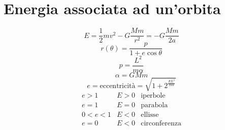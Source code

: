 \section{Energia associata ad un'orbita}
\begin{equation*}E=\frac{1}{2}mv^2-G\frac{Mm}{r^2}=-G\frac{Mm}{2a}\end{equation*}
\begin{equation*}r(\theta)=\frac{p}{1+e\cos\theta}\end{equation*}
\begin{equation*}p=\frac{L^2}{m\alpha}\end{equation*}
\begin{equation*}\alpha=GMm\end{equation*}
\begin{equation*}e=\text{eccentricità}=\sqrt{1+2^{\frac{EL^2}{m\alpha}}}\end{equation*}
$$\begin{array}{llc}
e>1&E>0&\text{iperbole}\\
e=1&E=0&\text{parabola}\\
0<e<1&E<0&\text{ellisse}\\
e=0&E<0&\text{circonferenza}\\
\end{array}$$
